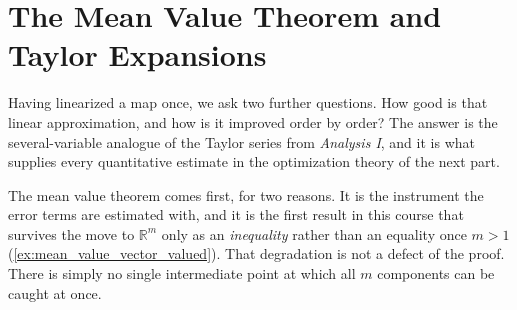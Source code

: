 \chapter{The Mean Value Theorem and Taylor Expansions}
\label{ch:taylor}

Having linearized a map once, we ask two further questions. How good is that linear approximation,
and how is it improved order by order? The answer is the several-variable analogue of the Taylor
series from \emph{Analysis I}, and it is what supplies every quantitative estimate in the
optimization theory of the next part.

The mean value theorem comes first, for two reasons. It is the instrument the error terms are
estimated with, and it is the first result in this course that survives the move to
$\mathbb{R}^m$ only as an \emph{inequality} rather than an equality once $m > 1$ (\cref{ex:mean_value_vector_valued}).
That degradation is not a defect of the proof. There is simply no single intermediate point at
which all $m$ components can be caught at once.






